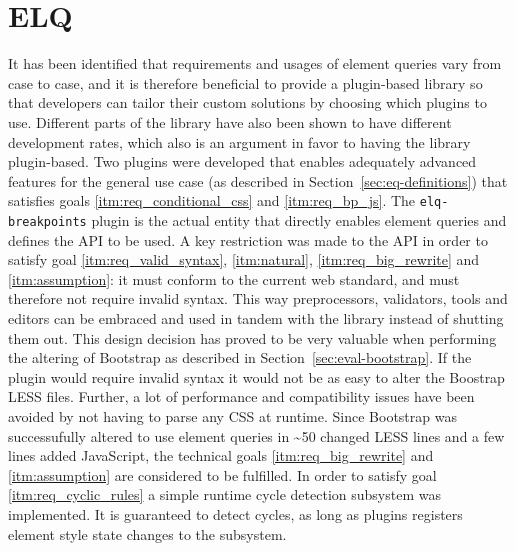 \documentclass[a4paper,11pt]{kth-mag}
\newcommand{\code}[1]{\texttt{#1}}
\begin{document}
    \section{ELQ}
    It has been identified that requirements and usages of element queries vary from case to case, and it is therefore beneficial to provide a plugin-based library so that developers can tailor their custom solutions by choosing which plugins to use.
    Different parts of the library have also been shown to have different development rates, which also is an argument in favor to having the library plugin-based.
    Two plugins were developed that enables adequately advanced features for the general use case (as described in Section~\ref{sec:eq-definitions}) that satisfies goals \ref{itm:req_conditional_css} and \ref{itm:req_bp_js}.
    The \code{elq-breakpoints} plugin is the actual entity that directly enables element queries and defines the \gls{API} to be used.
    A key restriction was made to the \gls{API} in order to satisfy goal \ref{itm:req_valid_syntax}, \ref{itm:natural}, \ref{itm:req_big_rewrite} and \ref{itm:assumption}: it must conform to the current \gls{web} standard, and must therefore not require invalid syntax.
    This way preprocessors, validators, tools and editors can be embraced and used in tandem with the library instead of shutting them out.
    This design decision has proved to be very valuable when performing the altering of \gls{Bootstrap} as described in Section~\ref{sec:eval-bootstrap}.
    If the plugin would require invalid syntax it would not be as easy to alter the Boostrap \gls{LESS} files.
    Further, a lot of performance and compatibility issues have been avoided by not having to parse any \gls{CSS} at runtime.
    Since \gls{Bootstrap} was successufully altered to use element queries in \textasciitilde50 changed \gls{LESS} lines and a few lines added \gls{JavaScript}, the technical goals \ref{itm:req_big_rewrite} and \ref{itm:assumption} are considered to be fulfilled.
    In order to satisfy goal \ref{itm:req_cyclic_rules} a simple runtime cycle detection subsystem was implemented.
    It is guaranteed to detect cycles, as long as plugins registers element style state changes to the subsystem.
    
\end{document}
